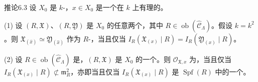 \begin{SGAresult}{推论}{6.3}
设 $X_0$ 是 $k$-，$x\in X_0$ 是一个在 $k$ 上有理的。

(1) 设 $(R,\mathfrak X)$、$(R,\mathfrak Y)$ 是 $X_0$ 的任意两个，其中 $R\in\operatorname{ob}(\widehat{\mathcal C}_\Lambda)$。假设 $k=k^2$。则 $\mathfrak X_{(\widehat x)}\simeq\mathfrak Y_{(\widehat x)}$ 作为 $R$-，当且仅当 $I_R(\mathfrak X_{(x)}\mid R)=I_R(\mathfrak Y_{(x)}\mid R)$。

(2) 设 $R\in\operatorname{ob}(\widehat{\mathcal C}_\Lambda)$ 是，$(R,\mathfrak X)$ 是 $X_0$ 的一个。则 $\mathcal O_{\mathfrak X,x}$ 为，当且仅当 $I_R(\mathfrak X_{(x)}\mid R)\not\subset\mathfrak m_R^2$，亦即当且仅当 $I_R(\mathfrak X_{(x)}\mid R)$ 是 $\operatorname{Spf}(R)$ 中的一个。
\end{SGAresult}
